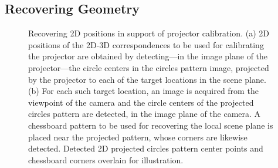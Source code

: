 \documentclass[review]{elsarticle}
\begin{document}
\subsection{Recovering Geometry}\label{sec:approach:geometry}

\begin{figure}
    \centering
    \qquad
    \caption{Recovering 2D positions in support of projector calibration. (a) 2D positions of the 2D-3D correspondences to be used for calibrating the projector are obtained by detecting---in the image plane of the projector---the circle centers in the circles pattern image, projected by the projector to each of the target locations in the scene plane. (b) For each such target location, an image is acquired from the viewpoint of the camera and the circle centers of the projected circles pattern are detected, in the image plane of the camera. A chessboard pattern to be used for recovering the local scene plane is placed near the projected pattern, whose corners are likewise detected. Detected 2D projected circles pattern center points and chessboard corners overlain for illustration.} %
    \label{fig:2d}
\end{figure}
\end{document}
